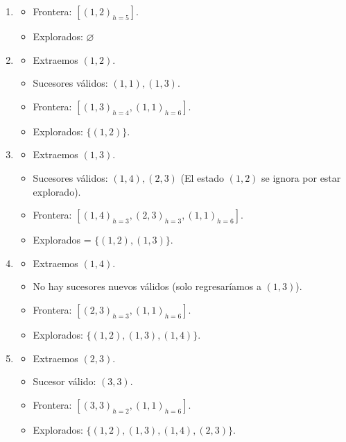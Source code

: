 \begin{enumerate}[label=Paso \arabic*:]
\item

  \begin{itemize}
  \item Frontera: $[(1,2)_{h=5}]$.
  \item Explorados: $\varnothing$
  \end{itemize}
  
\item

  \begin{itemize}
  \item Extraemos $(1,2)$.
  \item Sucesores válidos: $(1,1), (1,3)$.
  \item Frontera: $[(1,3)_{h=4}, (1,1)_{h=6}]$.
  \item Explorados: $\{(1,2)\}$.
  \end{itemize}
  
\item

  \begin{itemize}
  \item Extraemos $(1,3)$.
  \item Sucesores válidos: $(1,4), (2,3)$ (El estado $(1,2)$ se ignora por estar explorado).
  \item Frontera: $[(1,4)_{h=3}, (2,3)_{h=3}, (1,1)_{h=6}]$.
  \item Explorados = $\{(1,2), (1,3)\}$.
  \end{itemize}
  
\item

  \begin{itemize}
  \item Extraemos $(1,4)$.
  \item No hay sucesores nuevos válidos (solo regresaríamos a $(1,3)$).
  \item Frontera: $[(2,3)_{h=3}, (1,1)_{h=6}]$.
  \item Explorados: $\{(1,2), (1,3), (1,4)\}$.
  \end{itemize}
  
\item

  \begin{itemize}
  \item Extraemos $(2,3)$.
  \item Sucesor válido: $(3,3)$.
  \item Frontera: $[(3,3)_{h=2}, (1,1)_{h=6}]$.
  \item Explorados: $\{(1,2), (1,3), (1,4), (2,3)\}$.
  \end{itemize}
  

\end{enumerate}

